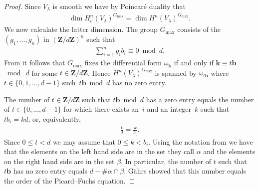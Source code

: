 \documentclass[pdftex]{sigma}
\numberwithin{equation}{section}
\begin{document}
\begin{proof}Since $V_\lambda$ is smooth we have by Poincar\'e duality \cite{BerPoi} that \begin{gather*}\dim H^n_c(V_\lambda)^{G_{\max}}=\dim H^n(V_\lambda)^{G_{\max}}.\end{gather*}
We now calculate the latter dimension. The group $G_{\max}$ consists of the $(g_1,\dots,g_n)$ in $ (\mathbf{Z}/d\mathbf{Z})^n$ such that \begin{gather*}\sum_{i=1}^n g_ib_i\equiv 0 \bmod d.\end{gather*} From \cite[Lemma~4.2]{Zetafamrec} it follows that $G_{\max}$ f\/ixes the dif\/ferential form $\omega_{\mathbf{k}}$ if and only if $\mathbf{k}\equiv t\mathbf{b}$ $\bmod~d$ for some $t\in \mathbf{Z}/d\mathbf{Z}$. Hence $H^n(V_{\lambda})^{G_{\max}}$ is spanned by $\omega_{t\mathbf{b}}$ where $t\in \{0,1,\dots,d-1\}$ such~$t\mathbf{b} \bmod d$ has no zero entry.

The number of $t \in \mathbf{Z}/d\mathbf{Z}$ such that $t\mathbf{b} \bmod d$ has a zero entry equals the number of $t \in \{0,\dots,d-1\}$ for which there exists an~$i$ and an integer~$k$ such that $t b_i=k d$, or, equivalently,
\begin{gather*} \frac{t}{d}=\frac{k}{b_i}.\end{gather*}
Since $0\leq t<d$ we may assume that $ 0\leq k <b_i$. Using the notation from \cite[Section~2]{DKSSVW} we have that the elements on the left hand side are in the set they call $\alpha$ and the elements on the right hand side are in the set $\beta$. In particular, the number of $t$ such that $t\mathbf{b}$ has no zero entry equals $d-\# \alpha \cap \beta$. G\"ahrs \cite[Theorem~2.8]{GaehrsPhD} showed that this number equals the order of the Picard--Fuchs equation.
\end{proof}
\end{document}
